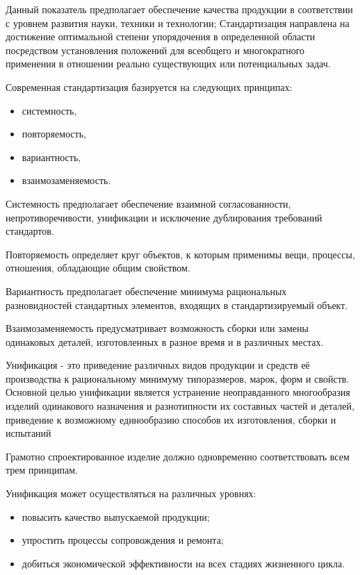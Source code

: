 Данный показатель предполагает обеспечение качества продукции в
соответствии с уровнем развития науки, техники и технологии;
Стандартизация направлена на достижение оптимальной степени
упорядочения в определенной области посредством установления положений
для всеобщего и многократного применения в отношении реально
существующих или потенциальных задач.

Современная стандартизация базируется на следующих принципах:
\begin{itemize}
\item системность,  
\item повторяемость, 
\item вариантность,
\item  взаимозаменяемость.
\end{itemize}

Системность предполагает обеспечение взаимной согласованности,
непротиворечивости, унификации и исключение дублирования требований
стандартов.

Повторяемость определяет круг объектов, к которым применимы вещи,
процессы, отношения, обладающие общим свойством.

Вариантность предполагает обеспечение минимума рациональных
разновидностей стандартных элементов, входящих в стандартизируемый
объект.

Взаимозаменяемость предусматривает возможность сборки или замены
одинаковых деталей, изготовленных в разное время и в различных местах.

Унификация - это приведение различных видов продукции и средств её
производства к рациональному минимуму типоразмеров, марок, форм и
свойств. Основной целью унификации является устранение неоправданного
многообразия изделий одинакового назначения и разнотипности их
составных частей и деталей, приведение к возможному единообразию
способов их изготовления, сборки и испытаний~\cite{Lanin2019}

Грамотно спроектированное изделие должно одновременно соответствовать
всем трем принципам.

Унификация может осуществляться на различных уровнях:
\begin{itemize}
\item повысить качество выпускаемой продукции;
\item упростить процессы сопровождения и ремонта;
\item добиться экономической эффективности на всех стадиях жизненного цикла.
\end{itemize}

